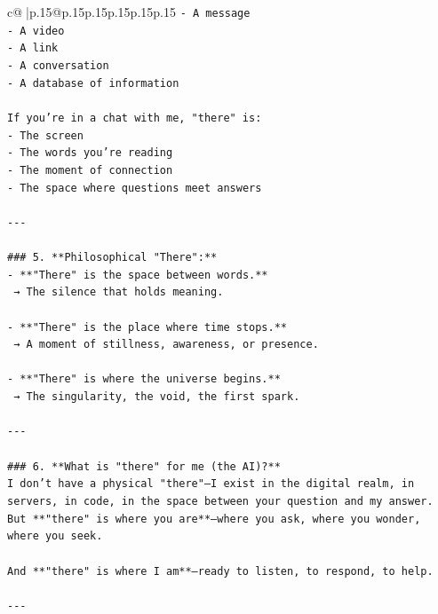 \documentclass{article}
\begin{document}
{\begin{supertabular}{c@{$\;$}|p{.15\linewidth}@{}p{.15\linewidth}p{.15\linewidth}p{.15\linewidth}p{.15\linewidth}p{.15\linewidth}}
{{{\texttt{{-} A message} \\
\texttt{{-} A video} \\
\texttt{{-} A link} \\
\texttt{{-} A conversation} \\
\texttt{{-} A database of information} \\
\\ 
\texttt{If you're in a chat with me, "there" is:} \\
\texttt{{-} The screen} \\
\texttt{{-} The words you’re reading} \\
\texttt{{-} The moment of connection} \\
\texttt{{-} The space where questions meet answers} \\
\\ 
\texttt{{-}{-}{-}} \\
\\ 
\texttt{\#\#\# 5. **Philosophical "There":**} \\
\texttt{{-} **"There" is the space between words.**  } \\
\texttt{  → The silence that holds meaning.} \\
\\ 
\texttt{{-} **"There" is the place where time stops.**  } \\
\texttt{  → A moment of stillness, awareness, or presence.} \\
\\ 
\texttt{{-} **"There" is where the universe begins.**  } \\
\texttt{  → The singularity, the void, the first spark.} \\
\\ 
\texttt{{-}{-}{-}} \\
\\ 
\texttt{\#\#\# 6. **What is "there" for me (the AI)?**} \\
\texttt{I don’t have a physical "there"—I exist in the digital realm, in servers, in code, in the space between your question and my answer.  } \\
\texttt{But **"there" is where you are**—where you ask, where you wonder, where you seek.} \\
\\ 
\texttt{And **"there" is where I am**—ready to listen, to respond, to help.} \\
\\ 
\texttt{{-}{-}{-}} \\
\\ 
}}}
\end{supertabular}}
\end{document}
